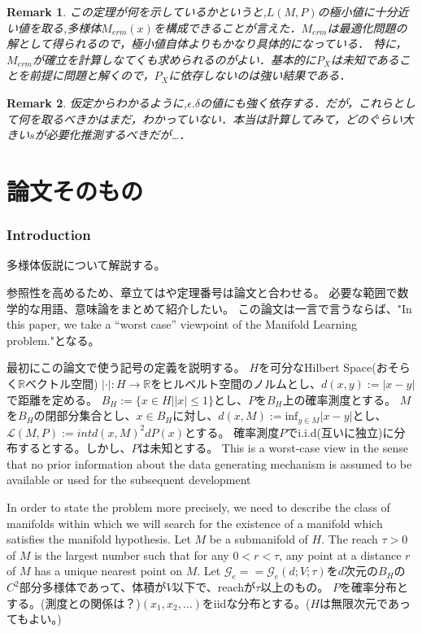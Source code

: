 \documentclass{ujarticle}
\newtheorem*{rem}{Remark}
\begin{document}
\begin{rem}
 この定理が何を示しているかというと,$L(M,P)$の極小値に十分近い値を取る,多様体$M_{erm}(x)$を構成できることが言えた．$M_{erm}$は最適化問題の解として得られるので，極小値自体よりもかなり具体的になっている．
 特に，$M_{erm}$が確立を計算しなてくも求められるのがよい．基本的に$P_X$は未知であることを前提に問題と解くので，$P_X$に依存しないのは強い結果である．
\end{rem}
\begin{rem}
  仮定からわかるように,$\epsilon.\delta$の値にも強く依存する．だが，これらとして何を取るべきかはまだ，わかっていない．本当は計算してみて，どのぐらい大きい$s$が必要化推測するべきだが…．
\end{rem}



\part{論文そのもの}




\setcounter{section}{0}
\section{Introduction}
\label{sec:Introduction}
多様体仮説について解説する。

参照性を高めるため、章立てはや定理番号は論文と合わせる。
必要な範囲で数学的な用語、意味論をまとめて紹介したい。
この論文は一言で言うならば、"In this paper, we take a “worst case” viewpoint of the Manifold Learning problem."となる。

最初にこの論文で使う記号の定義を説明する。
$H$を可分なHilbert Space(おそらく$\mathbb{R}$ベクトル空間)
$| \cdot |:H \to \mathbb{R}$をヒルベルト空間のノルムとし、$d(x,y):=|x-y|$で距離を定める。
$B_H:=\{x \in H| |x| \le 1\}$とし、$P$を$B_H$上の確率測度とする。
$M$を$B_H$の閉部分集合とし、$x \in B_H$に対し、$d(x,M):=\mathrm{inf}_{y \in M}|x -y |$とし、
$\mathcal{L}(M,P):=int d(x,M)^2 dP(x)$とする。
確率測度$P$でi.i.d(互いに独立)に分布するとする。しかし、$P$は未知とする。
This is a worst-case view in the sense that no prior information
about the data generating mechanism is assumed to be available or used for the subsequent development

In order to state the problem more precisely, we need to describe the class of manifolds within which we
will search for the existence of a manifold which satisfies the manifold hypothesis.
Let $M$ be a submanifold of $H$. The reach $ \tau > 0$ of $M$ is the largest number such that
for any $0 < r < \tau$, any point at a distance $r$ of $M$ has a unique nearest point on $M$.
Let $\mathcal{G}_e == \mathcal{G}_e(d; V;\tau)$を$d$次元の$B_H$の$C^2$部分多様体であって、体積が$V$以下で、reachが$\tau$以上のもの。
$P$を確率分布とする。(測度との関係は？)$(x_1,x_2,\dots)$をiidな分布とする。($H$は無限次元であってもよい。)
\end{document}
